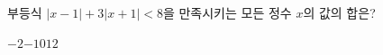 부등식 $|x-1|+3|x+1|<8$을 만족시키는 모든 정수 $x$의 값의 합은?
\begin{choices32}{$-2$}{$-1$}{$0$}{$1$}{$2$}\end{choices32}
